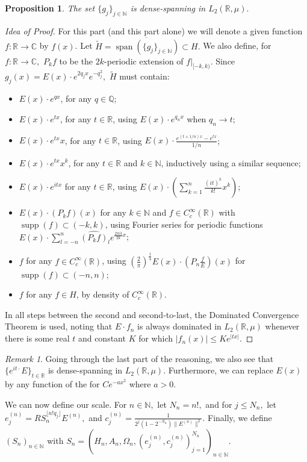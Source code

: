 \documentclass{amsart}
\newtheorem{prop}[thm]{Proposition}
\theoremstyle{definition}
\theoremstyle{remark}
\newtheorem{remark}[thm]{Remark}
\def \Span{\operatorname{span}}
\begin{document}
\begin{prop}
	The set $\{g_j\}_{j\in\mathbb{N}}$ is dense-spanning in $L_2(\mathbb{R},\mu).$
\end{prop}
\begin{proof}[Idea of Proof]
	For this part (and this part alone) we will denote a given function $f:\mathbb{R}\rightarrow\mathbb{C}$ by $f(x)$.  Let $\tilde{H}=\overline{\Span(\{g_j\}_{j\in\mathbb{N}})}\subset H.$ We also define, for $f:\mathbb{R}\rightarrow \mathbb{C},$ $P_k f$ to be the $2k$-periodic extension of $f|_{[-k,k)}.$ Since $g_j(x)=E(x)\cdot e^{2q_j x}e^{-q_j^2},$ $\tilde{H}$ must contain:
	\begin{itemize}
		\item $E(x)\cdot e^{qx}$, for any $q\in \mathbb{Q}$;
		\item $E(x)\cdot e^{tx}$, for any $t\in\mathbb{R}$, using $E(x)\cdot e^{q_nx}$ when $q_n\rightarrow t$;
		\item $E(x)\cdot e^{tx} x$, for any $t\in\mathbb{R}$, using $E(x)\cdot \frac{e^{(t+1/n)x}-e^{tx}}{1/n}$;
		\item $E(x)\cdot e^{tx} x^k$, for any $t\in\mathbb{R}$ and $k\in\mathbb{N}$, inductively using a similar sequence;
		\item  $E(x)\cdot e^{itx}$ for any $t\in\mathbb{\mathbb{R}}$, using $E(x)\cdot \left(\sum_{k=1}^n\frac{(it)^k}{k!}x^k\right);$
		\item $E(x)\cdot (P_kf)(x)$ for any $k\in\mathbb{N}$ and $f\in C_c^{\infty}(\mathbb{R})$ with $\operatorname{supp}(f)\subset(-k,k)$, using Fourier series for periodic functions $E(x)\cdot \sum_{l=-n}^n\widehat{(P_kf)}_le^{ \frac{2\pi i l}{2k}x}$;
		\item $f$ for any $f\in C_c^{\infty}(\mathbb{R})$, using $\left(\frac{2}{\pi}\right)^{\frac{1}{4}}E(x)\cdot (P_n\frac{f}{E})(x)$ for $\operatorname{supp}(f)\subset(-n,n)$;
		\item $f$ for any $f\in H$, by density of $C_c^{\infty}(\mathbb{R}).$
	\end{itemize}
	In all steps between the second and second-to-last, the Dominated Convergence Theorem is used, noting that $E\cdot f_n$ is always dominated in $L_2(\mathbb{R},\mu)$ whenever there is some real $t$ and constant $K$ for which $|f_n(x)|\leq Ke^{|tx|}$.  
\end{proof}
\begin{remark}\label{remark_dense_gaussian}
	Going through the last part of the reasoning, we also see that $\{e^{it\cdot} E\}_{t\in\mathbb{R}}$ is dense-spanning in $L_2(\mathbb{R},\mu).$ Furthermore, we can replace $E(x)$ by any function of the for $Ce^{-a x^2}$ where $a>0.$
\end{remark}
We can now define our scale. For $n\in\mathbb{N},$ let $N_n=n!,$ and for $j\leq N_n,$ let $e_j^{(n)}=RS_n^{\lfloor n!q_j\rfloor} E^{(n)},$ and $c_j^{(n)}=\frac{1}{2^j(1-2^{-N_n})\|E^{(n)}\|^2}.$ Finally, we define $(S_n)_{n\in\mathbb{N}}$ with $S_n=(H_n,A_n,\Omega_n, (e_j^{(n)},c_j^{(n)})_{j=1}^{N_n})_{n\in\mathbb{N}}.$
\end{document}
